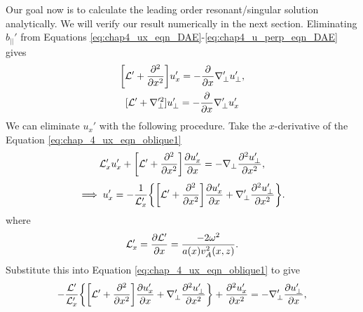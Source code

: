 Our goal now is to calculate the leading order resonant/singular solution analytically. We will verify our result numerically in the next section. Eliminating $\hat{b}_{||}'$ from Equations \eqref{eq:chap4_ux_eqn_DAE}-\eqref{eq:chap4_u_perp_eqn_DAE} gives
\begin{gather}
    \label{eq:chap_4_ux_eqn_oblique1}
    \qty[\mathcal{L}'+\pdv[2]{}{x}]u_x'=-\pdv{}{x}\nabla_\perp' u_\perp', \\
    \label{eq:chap_4_u_perp_eqn_oblique1}
    [\mathcal{L}'+\nabla_\perp'^2]u_\perp'=-\pdv{}{x}\nabla_\perp' u_x' 
\end{gather}
We can eliminate $u_x'$ with the following procedure. 
Take the $x$-derivative of the Equation \eqref{eq:chap_4_ux_eqn_oblique1}
\[\mathcal{L}_x'u_x'+\qty[\mathcal{L}'+\pdv[2]{}{x}]\pdv{u_x'}{x}=-\nabla_\perp\pdv[2]{u_\perp'}{x},\]
\[\implies u_x'=-\frac{1}{\mathcal{L}_x'}\qty{\qty[\mathcal{L'}+\pdv[2]{}{x}]\pdv{u_x'}{x}+\nabla_\perp'\pdv[2]{u_\perp'}{x}}.\]
where
\begin{equation}
    \mathcal{L}_x' = \pdv{\mathcal{L}'}{x}=\frac{-2\omega^2}{a(x)v_A^2(x,z)}.
\end{equation}
Substitute this into Equation \eqref{eq:chap_4_ux_eqn_oblique1} to give
\[-\frac{\mathcal{L}'}{\mathcal{L}_x'}\qty{\qty[\mathcal{L}'+\pdv[2]{}{x}]\pdv{u_x'}{x}+\nabla_\perp'\pdv[2]{u_\perp'}{x}}+\pdv[2]{u_x'}{x}=-\nabla_\perp'\pdv{u_\perp'}{x},\]
